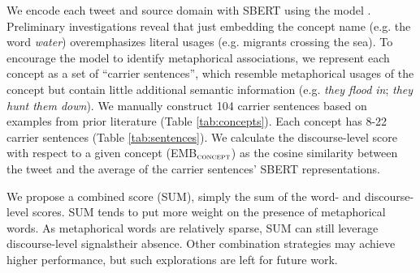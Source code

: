 We encode each tweet and source domain with SBERT using the  model \citep{reimers2019sentence}. 
Preliminary investigations reveal that just embedding the concept name (e.g. the word \textit{water}) overemphasizes literal usages (e.g. migrants crossing the sea). To encourage the model to identify metaphorical associations, we represent each concept as a set of ``carrier sentences'', which resemble metaphorical usages of the concept but contain little additional semantic information (e.g. \textit{they flood in}; \textit{they hunt them down}). We manually construct 104 carrier sentences based on examples from prior literature (Table \ref{tab:concepts}). Each concept has 8-22 carrier sentences (Table \ref{tab:sentences}). We calculate the discourse-level score with respect to a given concept (EMB$_{\textsc{concept}}$) as the cosine similarity between the tweet and the average of the carrier sentences' SBERT representations.%

We propose a combined score (SUM), simply the sum of the word- and discourse-level scores. SUM tends to put more weight on the presence of metaphorical words. As metaphorical words are relatively sparse, SUM can still leverage discourse-level signalstheir absence. Other combination strategies may achieve higher performance, but such explorations are left for future work.



